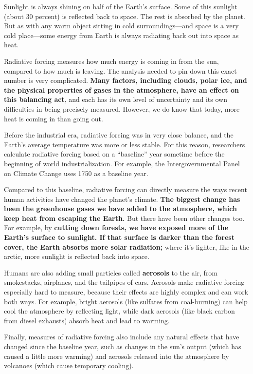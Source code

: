 Sunlight is always shining on half of the Earth’s surface. Some of this sunlight (about 30 percent) is reflected back to space. The rest is absorbed by the planet. But as with any warm object sitting in cold surroundings—and space is a very cold place—some energy from Earth is always radiating back out into space as heat.

Radiative forcing measures how much energy is coming in from the sun, compared to how much is leaving. The analysis needed to pin down this exact number is very complicated. \textbf{Many factors, including clouds, polar ice, and the physical properties of gases in the atmosphere, have an effect on this balancing act}, and each has its own level of uncertainty and its own difficulties in being precisely measured. However, we do know that today, more heat is coming in than going out.


Before the industrial era, radiative forcing was in very close balance, and the Earth’s average temperature was more or less stable. For this reason, researchers calculate radiative forcing based on a “baseline” year sometime before the beginning of world industrialization. For example, the Intergovernmental Panel on Climate Change uses 1750 as a baseline year.

Compared to this baseline, radiative forcing can directly measure the ways recent human activities have changed the planet’s climate. \textbf{The biggest change has been the greenhouse gases we have added to the atmosphere, which keep heat from escaping the Earth.} But there have been other changes too. For example, by \textbf{cutting down forests, we have exposed more of the Earth’s surface to sunlight. If that surface is darker than the forest cover, the Earth absorbs more solar radiation;} where it’s lighter, like in the arctic, more sunlight is reflected back into space.

Humans are also adding small particles called\textbf{ aerosols} to the air, from smokestacks, airplanes, and the tailpipes of cars. Aerosols make radiative forcing especially hard to measure, because their effects are highly complex and can work both ways. For example, bright aerosols (like sulfates from coal-burning) can help cool the atmosphere by reflecting light, while dark aerosols (like black carbon from diesel exhausts) absorb heat and lead to warming.

Finally, measures of radiative forcing also include any natural effects that have changed since the baseline year, such as changes in the sun’s output (which has caused a little more warming) and aerosols released into the atmosphere by volcanoes (which cause temporary cooling).

